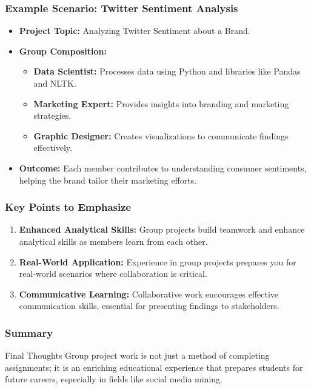 \documentclass{beamer}
\begin{document}
\begin{frame}[fragile]
    \frametitle{Example Scenario: Twitter Sentiment Analysis}
    \begin{itemize}
        \item \textbf{Project Topic:} Analyzing Twitter Sentiment about a Brand.
        \item \textbf{Group Composition:}
            \begin{itemize}
                \item \textbf{Data Scientist:} Processes data using Python and libraries like Pandas and NLTK.
                \item \textbf{Marketing Expert:} Provides insights into branding and marketing strategies.
                \item \textbf{Graphic Designer:} Creates visualizations to communicate findings effectively.
            \end{itemize}
        \item \textbf{Outcome:} Each member contributes to understanding consumer sentiments, helping the brand tailor their marketing efforts.
    \end{itemize}
\end{frame}

\begin{frame}[fragile]
    \frametitle{Key Points to Emphasize}
    \begin{enumerate}
        \item \textbf{Enhanced Analytical Skills:} 
            Group projects build teamwork and enhance analytical skills as members learn from each other.
        \item \textbf{Real-World Application:} 
            Experience in group projects prepares you for real-world scenarios where collaboration is critical.
        \item \textbf{Communicative Learning:} 
            Collaborative work encourages effective communication skills, essential for presenting findings to stakeholders.
    \end{enumerate}
\end{frame}

\begin{frame}[fragile]
    \frametitle{Summary}
    \begin{block}{Final Thoughts}
        Group project work is not just a method of completing assignments; it is an enriching educational experience that prepares students for future careers, especially in fields like social media mining.
    \end{block}
\end{frame}
\end{document}
